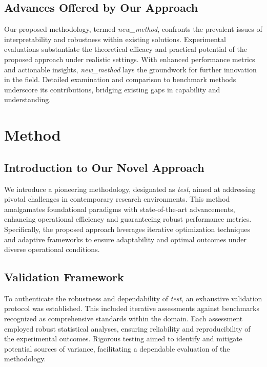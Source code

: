 \documentclass{article} %
\begin{document}
\subsection{Advances Offered by Our Approach}

Our proposed methodology, termed \textit{new\_method}, confronts the prevalent issues of interpretability and robustness within existing solutions. Experimental evaluations substantiate the theoretical efficacy and practical potential of the proposed approach under realistic settings. With enhanced performance metrics and actionable insights, \textit{new\_method} lays the groundwork for further innovation in the field. Detailed examination and comparison to benchmark methods underscore its contributions, bridging existing gaps in capability and understanding.

\section{Method}
\label{sec:method}
\subsection{Introduction to Our Novel Approach}

We introduce a pioneering methodology, designated as \textit{test}, aimed at addressing pivotal challenges in contemporary research environments. This method amalgamates foundational paradigms with state-of-the-art advancements, enhancing operational efficiency and guaranteeing robust performance metrics. Specifically, the proposed approach leverages iterative optimization techniques and adaptive frameworks to ensure adaptability and optimal outcomes under diverse operational conditions.

\subsection{Validation Framework}

To authenticate the robustness and dependability of \textit{test}, an exhaustive validation protocol was established. This included iterative assessments against benchmarks recognized as comprehensive standards within the domain. Each assessment employed robust statistical analyses, ensuring reliability and reproducibility of the experimental outcomes. Rigorous testing aimed to identify and mitigate potential sources of variance, facilitating a dependable evaluation of the methodology.
\end{document}
